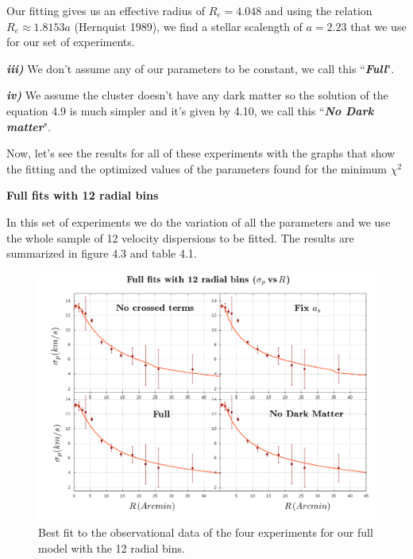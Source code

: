 Our fitting gives us an effective radius of $R_{e}=4.048$ and using the relation $R_{e}\approx1.8153a$ (Hernquist 1989), we find a stellar scalength of $a=2.23$ that we use for our set of experiments.

\textbf{\textit{iii)}} We don't assume any of our parameters to be constant, we call this ``\textbf{\textit{Full}}". 

\textbf{\textit{iv)}} We assume the cluster doesn't have any dark matter so the solution of the equation 4.9 is much simpler and it's given by 4.10, we call this ``\textbf{\textit{No Dark matter}}".

Now, let's see the results for all of these experiments with the graphs that show the fitting and the optimized values of the parameters found for the minimum $\chi^{2}$

\newpage

\begin{center}
\textbf{Full fits with 12 radial bins}
\end{center}

In this set of experiments we do the variation of all the parameters and we use the whole sample of 12 velocity dispersions to be fitted. The results are summarized in figure 4.3 and table 4.1.

\begin{figure}[H]
\centering
\includegraphics[width=15cm]{images/all_params_refinado_12.png}
\caption[Best fit of the full model for 12 radial bins]{Best fit to the observational data of the four experiments for our full model with the 12 radial bins.}
\end{figure}

